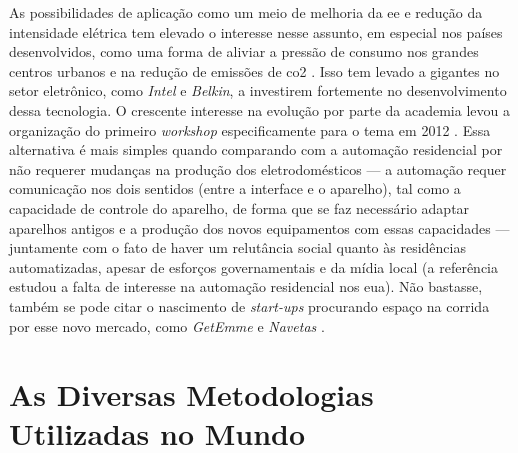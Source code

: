 As possibilidades de aplicação como um meio de melhoria da \gls{ee} e
redução da intensidade elétrica tem elevado o interesse nesse assunto,
em especial nos países desenvolvidos, como uma forma de aliviar
a pressão de consumo nos grandes centros urbanos e na redução de
emissões de \gls{co2} \cite{nilm_zeifman_review_2011}.
Isso tem levado a gigantes no setor eletrônico, como \emph{Intel} e
\emph{Belkin}, a investirem fortemente no desenvolvimento dessa
tecnologia. O crescente interesse na evolução por parte da academia
levou a organização do primeiro \emph{workshop} especificamente para o
tema em 2012 \cite{workshop_nilm}. Essa alternativa é mais simples
quando comparando com a automação residencial por não requerer
mudanças na produção dos eletrodomésticos --- a automação requer
comunicação nos dois sentidos (entre a interface e o aparelho), tal
como a capacidade de controle do aparelho, de forma que se faz
necessário adaptar aparelhos antigos e a produção dos novos
equipamentos com essas capacidades --- juntamente com o fato de haver
um relutância social quanto às residências automatizadas, apesar de
esforços governamentais e da mídia local \cite{Lipoff_Automation_2010}
(a referência estudou a falta de interesse na automação residencial
nos \gls{eua}). Não bastasse, também se pode citar o nascimento de
\emph{start-ups} procurando espaço na corrida por esse novo mercado,
como \emph{GetEmme} \cite{getemme_site} e \emph{Navetas}
\cite{navetas_site}.

\section{As Diversas Metodologias Utilizadas no Mundo}
\label{sec:nilm_mundo}

